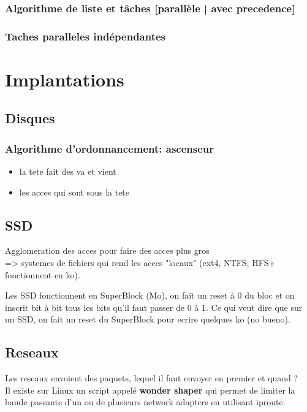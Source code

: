 \documentclass[11pt]{article}
\begin{document}
\subsubsection{Algorithme de liste et tâches [parallèle | avec precedence]}

\subsubsection{Taches paralleles indépendantes}


\pagebreak

\section{Implantations}
\subsection{Disques}
\subsubsection{Algorithme d'ordonnancement: ascenseur}
\begin{itemize}
    \item la tete fait des va et vient
    \item les acces qui sont sous la tete
\end{itemize}

\subsection{SSD}
Agglomeration des acces pour faire des acces plus gros\\
=> systemes de fichiers qui rend les acces "locaux" (ext4, NTFS, HFS+ fonctionnent en ko).

Les SSD fonctionnent en SuperBlock (Mo), on fait un reset à 0 du bloc et on inscrit bit à bit tous les bits qu'il faut passer de 0 à 1. Ce qui veut dire que sur un SSD, on fait un reset du SuperBlock pour ecrire quelques ko (no bueno).

\subsection{Reseaux}
Les reseaux envoient des paquets, lequel il faut envoyer en premier et quand ?\\
Il existe sur Linux un script appelé \textbf{wonder shaper} qui permet de limiter la bande passante d'un ou de plusieurs network adapters en utilisant iproute.
\end{document}
